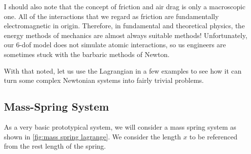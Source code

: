 I should also note that the concept of friction and air drag is only a macroscopic one. All of the interactions that we regard as friction are fundamentally electromagnetic in origin. Therefore, in fundamental and theoretical physics, the energy methods of mechanics are almost always suitable methods! Unfortunately, our 6-\gls{dof} model does not simulate atomic interactions, so us engineers are sometimes stuck with the barbaric methods of Newton.

With that noted, let us use the \gls{Lagrangian} in a few examples to see how it can turn some complex Newtonian systems into fairly trivial problems.
\subsection{Mass-Spring System}
As a very basic prototypical system, we will consider a mass spring system as shown in \autoref{fig:mass spring lagrange}. We consider the length $x$ to be referenced from the rest length of the spring.
